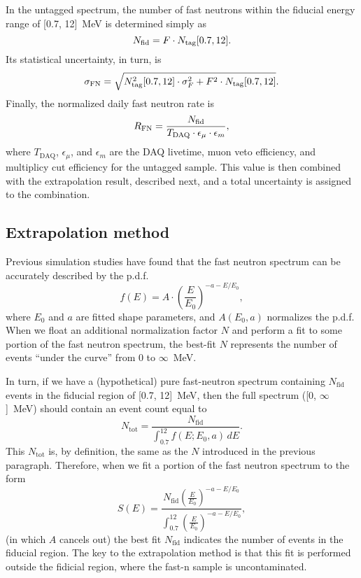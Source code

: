 \documentclass[../thesis.tex]{subfiles}
\begin{document}
In the untagged spectrum, the number of fast neutrons within the fiducial energy
range of [0.7, 12]~MeV is determined simply as
\[ N_\mathrm{fid} = F \cdot N_\mathrm{tag}[0.7, 12]. \] Its statistical uncertainty, in turn, is
\begin{equation}
  \label{eq:fastn_scal_unc}
  \sigma_\mathrm{FN} = \sqrt{N_\mathrm{tag}^2[0.7, 12]
    \cdot \sigma_F^2 + F^2 \cdot N_\mathrm{tag}[0.7, 12]}.
\end{equation}
Finally, the normalized daily fast neutron rate is
\begin{equation}
  \label{eq:fastn_rate}
  R_\mathrm{FN} = \frac{N_\mathrm{fid}}{T_\mathrm{DAQ} \cdot \epsilon_\mu \cdot \epsilon_m},
\end{equation}
where $T_\mathrm{DAQ}$, $\epsilon_\mu$, and $\epsilon_m$ are the DAQ livetime,
muon veto efficiency, and multiplicy cut efficiency for the untagged
sample. This value is then combined with the extrapolation result, described
next, and a total uncertainty is assigned to the combination.

\subsection{Extrapolation method}
\label{sec:fastn_extrap}

Previous simulation studies have found that the fast neutron spectrum can be
accurately described by the p.d.f.
\begin{equation}
  \label{eq:bkgFastnShape}
  f(E) = A \cdot \left( \frac{E}{E_0} \right)^{-a-E/E_0},  
\end{equation}
where $E_0$ and $a$ are fitted shape parameters, and $A(E_0, a)$ normalizes the
p.d.f. When we float an additional normalization factor $N$ and perform a fit to
some portion of the fast neutron spectrum, the best-fit $N$ represents the
number of events ``under the curve'' from 0 to $\infty$~MeV.

In turn, if we have a (hypothetical) pure fast-neutron spectrum containing
$N_\mathrm{fid}$ events in the fiducial region of [0.7, 12]~MeV, then the full
spectrum ([0, $\infty$]~MeV) should contain an event count equal to
\[ N_\mathrm{tot} = \frac{N_\mathrm{fid}}{\int_{0.7}^{12} f(E; E_0, a)\,dE }. \]
This $N_\mathrm{tot}$ is, by definition, the same as the $N$ introduced in the
previous paragraph. Therefore, when we fit a portion of the fast neutron
spectrum to the form
\begin{equation}
  \label{eq:fastn_extrap_form}
  S(E) = \frac{N_\mathrm{fid} \left( \frac{E}{E_0} \right)^{-a-E/E_0}}
  {\int_{0.7}^{12} \left( \frac{E}{E_0} \right)^{-a-E/E_0} },
\end{equation}
(in which $A$ cancels out) the best fit $N_\mathrm{fid}$ indicates the number of
events in the fiducial region. The key to the extrapolation method is that this
fit is performed outside the fidicial region, where the fast-n sample is
uncontaminated.
\end{document}
